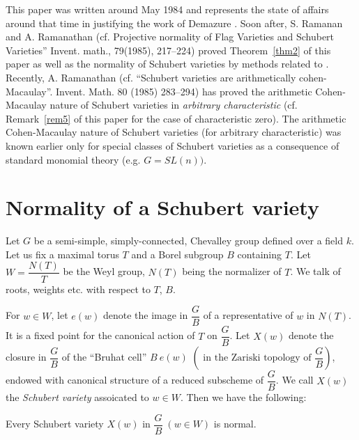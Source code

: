 This paper was written around May 1984 and represents the state of affairs around that time in justifying the work of Demazure \cite{key1}. Soon after, S. Ramanan and A. Ramanathan (cf. Projective normality of Flag Varieties and Schubert Varieties'' Invent. math., 79(1985), 217--224) proved Theorem~\ref{thm2} of this paper as well as the normality of Schubert varieties by methods related to \cite{key4}. Recently, A. Ramanathan (cf. ``Schubert varieties are arithmetically cohen-Macaulay''. Invent. Math. 80 (1985) 283--294) has proved the arithmetic Cohen-Macaulay nature of Schubert varieties in \textit{arbitrary characteristic} (cf. Remark~\ref{rem5} of this paper for the case of characteristic zero). The arithmetic Cohen-Macaulay nature of Schubert varieties (for arbitrary characteristic) was known earlier only for special classes of Schubert varieties as a consequence of standard monomial theory (e.g. $G=SL(n))$. 

\section{Normality of a Schubert variety}\label{s2}\pageoriginale

Let $G$ be a semi-simple, simply-connected, Chevalley group defined over a field $k$. Let us fix a maximal torus $T$ and a Borel subgroup $B$ containing $T$. Let $W=\dfrac{N(T)}{T}$ be the Weyl group, $N(T)$ being the normalizer of $T$. We talk of roots, weights etc. with respect to $T$, $B$. 

For $w\in W$, let $e(w)$ denote the image in $\dfrac{G}{B}$ of a representative of $w$ in $N(T)$. It is a fixed point for the canonical action of $T$ on $\dfrac{G}{B}$. Let $X(w)$ denote the closure in $\dfrac{G}{B}$ of the ``Bruhat cell'' $B\ e(w)$ $\left(\text{ in the Zariski topology of } \dfrac{G}{B}\right)$, endowed with canonical structure of a reduced subscheme of $\dfrac{G}{B}$. We call $X(w)$ the \textit{Schubert variety} assoicated to $w\in W$. Then we have the following: 

\begin{thm}\label{thm1}
Every Schubert variety $X(w)$ in $\dfrac{G}{B}\;(w \in W)$ is normal. 
\end{thm}


